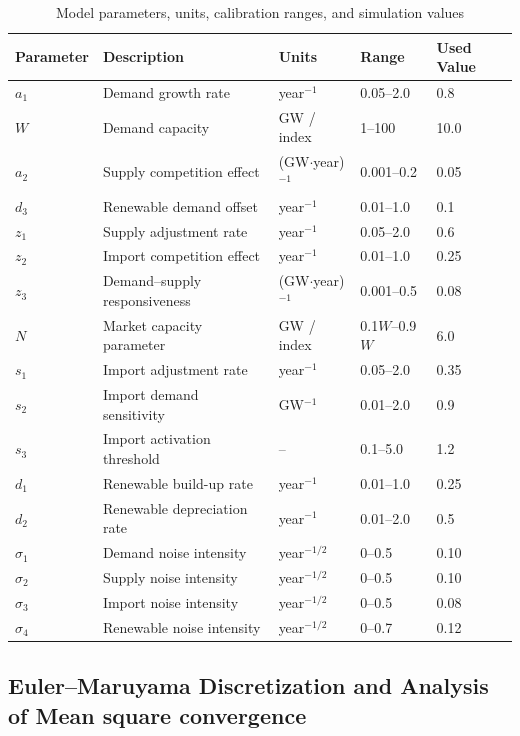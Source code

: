 \documentclass[11pt]{article}
\numberwithin{equation}{section}
\begin{document}
\begin{table}[ht]
\centering
\caption{Model parameters, units, calibration ranges, and simulation values}
\label{tab:params}
\renewcommand{\arraystretch}{1.5}
\begin{tabular}{lllll}
\hline
\textbf{Parameter} & \textbf{Description} & \textbf{Units} & \textbf{Range} & \textbf{Used Value} \\
\hline
$a_1$ & Demand growth rate & year$^{-1}$ & 0.05--2.0 & 0.8 \\
$W$   & Demand capacity & GW / index & 1--100 & 10.0 \\
$a_2$ & Supply competition effect & (GW$\cdot$year)$^{-1}$ & 0.001--0.2 & 0.05 \\
$d_3$ & Renewable demand offset & year$^{-1}$ & 0.01--1.0 & 0.1 \\
$z_1$ & Supply adjustment rate & year$^{-1}$ & 0.05--2.0 & 0.6 \\
$z_2$ & Import competition effect & year$^{-1}$ & 0.01--1.0 & 0.25 \\
$z_3$ & Demand–supply responsiveness & (GW$\cdot$year)$^{-1}$ & 0.001--0.5 & 0.08 \\
$N$   & Market capacity parameter & GW / index & 0.1$W$--0.9$W$ & 6.0 \\
$s_1$ & Import adjustment rate & year$^{-1}$ & 0.05--2.0 & 0.35 \\
$s_2$ & Import demand sensitivity & GW$^{-1}$ & 0.01--2.0 & 0.9 \\
$s_3$ & Import activation threshold & -- & 0.1--5.0 & 1.2 \\
$d_1$ & Renewable build-up rate & year$^{-1}$ & 0.01--1.0 & 0.25 \\
$d_2$ & Renewable depreciation rate & year$^{-1}$ & 0.01--2.0 & 0.5 \\
$\sigma_1$ & Demand noise intensity & year$^{-1/2}$ & 0--0.5 & 0.10 \\
$\sigma_2$ & Supply noise intensity & year$^{-1/2}$ & 0--0.5 & 0.10 \\
$\sigma_3$ & Import noise intensity & year$^{-1/2}$ & 0--0.5 & 0.08 \\
$\sigma_4$ & Renewable noise intensity & year$^{-1/2}$ & 0--0.7 & 0.12 \\
\hline
\end{tabular}
\end{table}

\subsection{Euler--Maruyama Discretization and Analysis of Mean square convergence}
\end{document}
